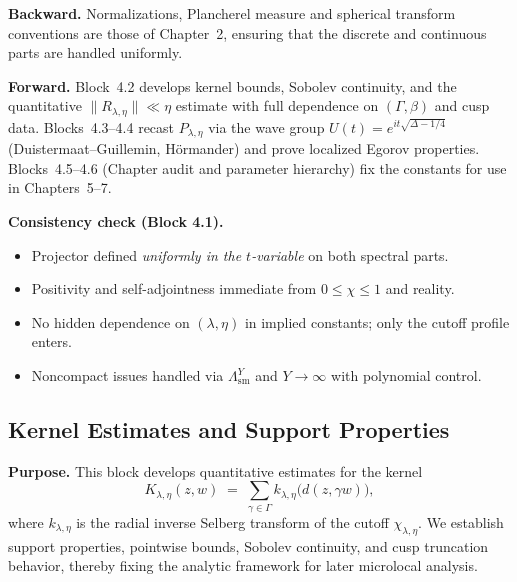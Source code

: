 \noindent\textbf{Backward.} Normalizations, Plancherel measure and spherical transform conventions are those of Chapter~2, ensuring that the discrete and continuous parts are handled uniformly.

\noindent\textbf{Forward.} 
Block~4.2 develops kernel bounds, Sobolev continuity, and the quantitative
$\|R_{\lambda,\eta}\|\ll\eta$ estimate with full dependence on $(\Gamma,\beta)$ and cusp data.
Blocks~4.3–4.4 recast $P_{\lambda,\eta}$ via the wave group
$U(t)=e^{it\sqrt{\Delta-1/4}}$ (Duistermaat–Guillemin, Hörmander) and prove localized Egorov properties.
Blocks~4.5–4.6 (Chapter audit and parameter hierarchy) fix the constants for use in Chapters~5–7.

\medskip

\noindent\textbf{Consistency check (Block 4.1).}
\begin{itemize}
  \item Projector defined \emph{uniformly in the $t$-variable} on both spectral parts.
  \item Positivity and self-adjointness immediate from $0\le\chi\le 1$ and reality.
  \item No hidden dependence on $(\lambda,\eta)$ in implied constants; only the cutoff profile enters.
  \item Noncompact issues handled via $\Lambda^Y_{\mathrm{sm}}$ and $Y\to\infty$ with polynomial control.
\end{itemize}



\subsection{Kernel Estimates and Support Properties}

\noindent\textbf{Purpose.}
This block develops quantitative estimates for the kernel
\[
  K_{\lambda,\eta}(z,w) \;=\; \sum_{\gamma\in\Gamma} k_{\lambda,\eta}\!\big(d(z,\gamma w)\big),
\]
where $k_{\lambda,\eta}$ is the radial inverse Selberg transform of the cutoff
$\chi_{\lambda,\eta}$. 
We establish support properties, pointwise bounds, Sobolev continuity, and cusp truncation behavior, thereby fixing the analytic framework for later microlocal analysis.

